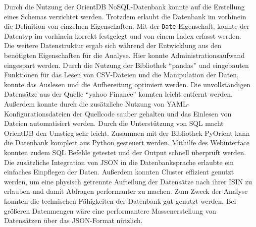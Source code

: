 Durch die Nutzung der OrientDB NoSQL-Datenbank konnte auf die Erstellung eines Schemas verzichtet werden. Trotzdem erlaubt die Datenbank im vorhinein die Definition von einzelnen Eigenschaften. Mit der \texttt{Date} Eigenschaft, konnte der Datentyp im vorhinein korrekt festgelegt und von einem Index erfasst werden. Die weitere Datenstruktur ergab sich während der Entwicklung aus den benötigten Eigenschaften für die Analyse. Hier konnte Administrationsaufwand eingespart werden. Durch die Nutzung der Bibliothek \enquote{pandas} und eingebauten Funktionen für das Lesen von \gls{CSV}-Dateien und die Manipulation der Daten, konnte das Auslesen und die Aufbereitung optimiert werden. Die unvollständigen Datensätze aus der Quelle \enquote{yahoo Finance} konnten leicht entfernt werden. Außerdem konnte durch die zusätzliche Nutzung von \gls{YAML}-Konfigurationsdateien der Quellcode sauber gehalten und das Einlesen von Dateien automatisiert werden. Durch die Unterstützung von \gls{SQL} macht OrientDB den Umstieg sehr leicht. Zusammen mit der Bibliothek PyOrient kann die Datenbank komplett aus Python gesteuert werden. Mithilfe des Webinterface konnten zudem \gls{SQL} Befehle getestet und der Output schnell überprüft werden. Die zusätzliche Integration von \gls{JSON} in die Datenbanksprache erlaubte ein einfaches Einpflegen der Daten. Außerdem konnten Cluster effizient genutzt werden, um eine physisch getrennte Aufteilung der Datensätze nach ihrer \gls{ISIN} zu erlauben und damit Abfragen performanter zu machen. Zum Zweck der Analyse konnten die technischen Fähigkeiten der Datenbank gut genutzt werden. Bei größeren Datenmengen wäre eine performantere Massenerstellung von Datensätzen über das \gls{JSON}-Format nützlich.


\clearpage